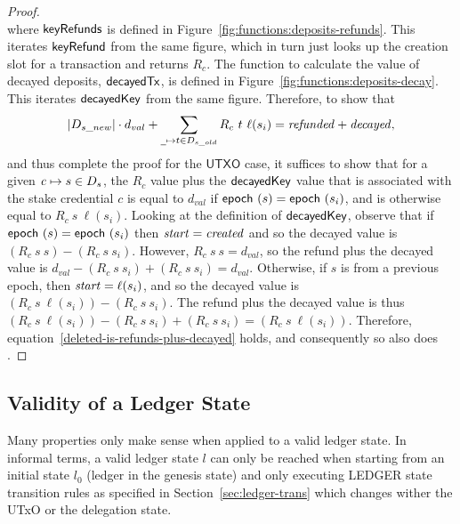 \begin{proof}
\begin{equation*}
  \end{equation*}
  where $\mathsf{keyRefunds}$ is defined in Figure~\ref{fig:functions:deposits-refunds}.
  This iterates $\mathsf{keyRefund}$ from the same figure,
  which in turn just looks up the creation slot for a transaction and returns $R_c$.
  The function to calculate the value of decayed deposits, $\mathsf{decayedTx}$, is defined in Figure~\ref{fig:functions:deposits-decay}.
  This iterates $\mathsf{decayedKey}$ from the same figure.
  Therefore, to show that
  \begin{equation}\label{deleted-is-refunds-plus-decayed}
    |D_{s\_new}|\cdot d_{val} + \sum_{\wcard\mapsto t\in D_{s\_old}}R_c~t~\ell(s_i)
    = \var{refunded} + \var{decayed},
  \end{equation}
  and thus complete the proof for the $\mathsf{UTXO}$ case,
  it suffices to show that for a given $\mathit{c}\mapsto s\in D_s$,
  the $R_c$ value plus the $\mathsf{decayedKey}$ value that is associated with the stake
  credential $c$ is equal to $d_{val}$ if $\mathsf{epoch}~ \mathit{(}s)=\mathsf{epoch}~ \mathit{(}s_i)$, and is otherwise equal to $R_c~s~\ell(s_i)$.
  Looking at the definition of $\mathsf{decayedKey}$, observe that if $\mathsf{epoch}~ \mathit{(}s)=\mathsf{epoch}~ \mathit{(}s_i)$
  then $\mathit{start}=\mathit{created}$ and so the decayed value is $(R_c~s~s)-(R_c~s~s_i)$.
  However, $R_c~s~s = d_{val}$, so the refund plus the decayed value is
  $d_{val}-(R_c~s~s_i)+(R_c~s~s_i)=d_{val}$.
  Otherwise, if $s$ is from a previous epoch, then $\mathit{start}=\ell(s_i)$, and so
  the decayed value is $(R_c~s~\ell(s_i))-(R_c~s~s_i)$.
  The refund plus the decayed value is thus
  $(R_c~s~\ell(s_i))-(R_c~s~s_i)+(R_c~s~s_i)=(R_c~s~\ell(s_i))$.
  Therefore, equation~\ref{deleted-is-refunds-plus-decayed} holds, and
  consequently so also does .

\end{proof}

\subsection{Validity of a Ledger State}
\label{sec:valid-ledg-state}

Many properties only make sense when applied to a valid ledger state. In
informal terms, a valid ledger state $l$ can only be reached when starting from
an initial state $l_{0}$ (ledger in the genesis state) and only executing LEDGER
state transition rules as specified in Section~\ref{sec:ledger-trans} which
changes wither the  UTxO or the delegation state.

